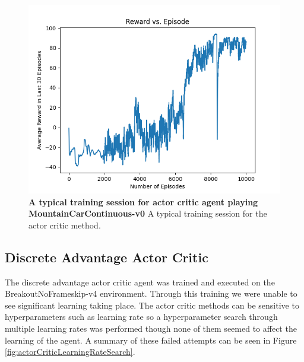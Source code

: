 \documentclass[conference]{IEEEtran}
\begin{document}
\begin{figure}[htbp]
\centerline{\includegraphics[scale=0.5]{best_actor_critic_mcc.png}}
\caption{\textbf{A typical training session for actor critic agent playing MountainCarContinuous-v0}  A typical training session for the actor critic method.}
\label{fig:actorCriticGoodTrainingMcc}
\end{figure}

\subsection{Discrete Advantage Actor Critic}
The discrete advantage actor critic agent was trained and executed on the BreakoutNoFrameskip-v4 environment.
Through this training we were unable to see significant learning taking place.
The actor critic methods can be sensitive to hyperparameters such as learning rate so a hyperparameter search through multiple learning rates was performed though none of them seemed to affect the learning of the agent.
A summary of these failed attempts can be seen in Figure \ref{fig:actorCriticLearningRateSearch}.
\end{document}
